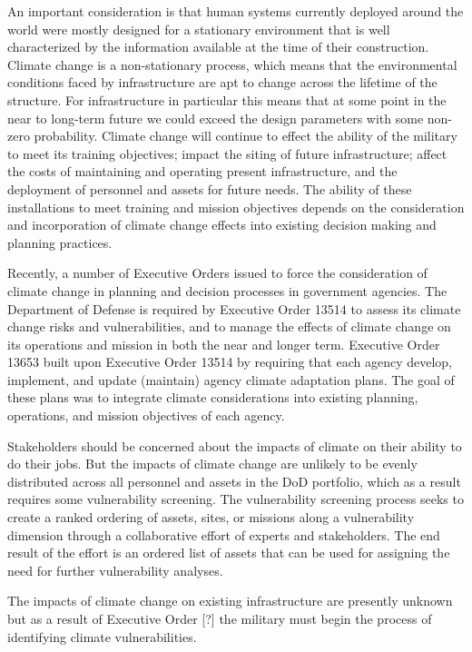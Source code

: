 \documentclass[10pt]{amsart}
\begin{document}
An important consideration is that human systems currently deployed around the world were mostly designed for a stationary environment that is well characterized by the information available at the time of their construction.
Climate change is a non-stationary process, which means that the environmental conditions faced by infrastructure are apt to change across the lifetime of the structure. 
For infrastructure in particular this means that at some point in the near to long-term future we could exceed the design parameters with some non-zero probability.
Climate change will continue to effect the ability of the military to meet its training objectives; impact the siting of future infrastructure; affect the costs of maintaining and operating present infrastructure, and the deployment of personnel and assets for future needs.
The ability of these installations to meet training and mission objectives depends on the consideration and incorporation of climate change effects into existing decision making and planning practices. 

Recently, a number of Executive Orders issued to force the consideration of climate change in planning and decision processes in government agencies. 
The Department of Defense is required by Executive Order 13514 to assess its climate change risks and vulnerabilities, and to manage the effects of climate change on its operations and mission in both the near and longer term. 
Executive Order 13653 built upon Executive Order 13514 by requiring that each agency develop, implement, and update (maintain) agency climate adaptation plans.
The goal of these plans was to integrate climate considerations into existing planning, operations, and mission objectives of each agency.

Stakeholders should be concerned about the impacts of climate on their ability to do their jobs. 
But the impacts of climate change are unlikely to be evenly distributed across all personnel and assets in the DoD portfolio, which as a result requires some vulnerability screening.
The vulnerability screening process seeks to create a ranked ordering of assets, sites, or missions along a vulnerability dimension through a collaborative effort of experts and stakeholders.
The end result of the effort is an ordered list of assets that can be used for assigning the need for further vulnerability analyses. 

The impacts of climate change on existing infrastructure are presently unknown but as a result of Executive Order [?] the military must begin the process of identifying climate vulnerabilities. 
\end{document}
